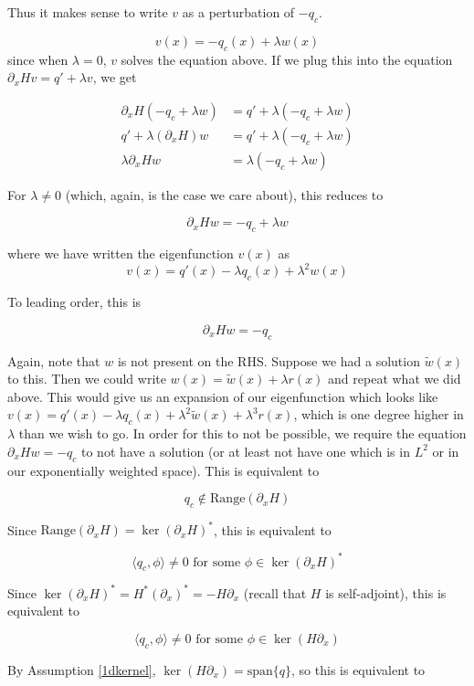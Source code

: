 \documentclass[12pt]{article}
\begin{document}
Thus it makes sense to write $v$ as a perturbation of $-q_c$.

\[
v(x) = -q_c(x) + \lambda w(x)
\]
since when $\lambda = 0$, $v$ solves the equation above. If we plug this into the equation $\partial_x H v = q' + \lambda v$, we get

\begin{align*}
\partial_x H(-q_c + \lambda w) &= q' + \lambda(-q_c + \lambda w) \\
q' + \lambda (\partial_x H) w &= q' + \lambda(-q_c + \lambda w) \\
\lambda \partial_x H w &= \lambda(-q_c + \lambda w)
\end{align*}

For $\lambda \neq 0$ (which, again, is the case we care about), this reduces to

\[
\partial_x H w = -q_c + \lambda w
\]

where we have written the eigenfunction $v(x)$ as
\[
v(x) = q'(x) - \lambda q_c(x) + \lambda^2 w(x)
\]

To leading order, this is

\[
\partial_x H w = -q_c
\]

Again, note that $w$ is not present on the RHS. Suppose we had a solution $\tilde{w}(x)$ to this. Then we could write $w(x) = \tilde{w}(x) + \lambda r(x)$ and repeat what we did above. This would give us an expansion of our eigenfunction which looks like $v(x) = q'(x) - \lambda q_c(x) + \lambda^2 \tilde{w}(x) + \lambda^3 r(x)$, which is one degree higher in $\lambda$ than we wish to go. In order for this to not be possible, we require the equation $\partial_x H w = -q_c$ to not have a solution (or at least not have one which is in $L^2$ or in our exponentially weighted space). This is equivalent to

\[
q_c \notin \textrm{Range}(\partial_x H)
\]

Since $\textrm{Range}(\partial_x H) = \ker (\partial_x H)^*$, this is equivalent to 

\[
\langle q_c, \phi \rangle \neq 0 \text{ for some }\phi \in \ker(\partial_x H)^*
\]

Since $\ker(\partial_x H)^* = H^* (\partial_x)^* = -H \partial_x$ (recall that $H$ is self-adjoint), this is equivalent to

\[
\langle q_c, \phi \rangle \neq 0 \text{ for some }\phi \in \ker(H \partial_x)
\]

By Assumption \ref{1dkernel}, $\ker(H \partial_x) = \textrm{span} \{q \}$, so this is equivalent to
\end{document}
